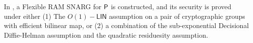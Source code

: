 In \cite{cryptoeprint:2022/1320}, a Flexible RAM SNARG for ${\mathsf{P}}$ is constructed, and its security is proved under either (1) The $O(1)-\mathsf{LIN}$ assumption on a pair of cryptographic groups with efficient bilinear map, or (2) a combination of the sub-exponential Decisional Diffie-Helman assumption and the quadratic residuesity assumption.
